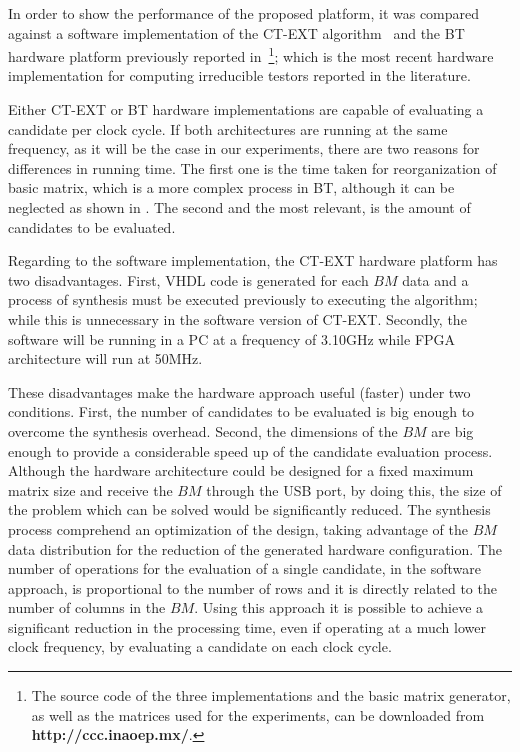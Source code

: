 \documentclass[authoryear,preprint,review,12pt]{elsarticle}
\begin{document}
In order to show the performance of the proposed platform, it was compared against a software 
implementation of the CT-EXT algorithm~\citep{R22} and the BT hardware platform previously 
reported in~\citep{Rod14}\footnote{The source code of the three implementations and the basic matrix
generator, as well as the matrices used for the experiments, can be downloaded from 
\textbf{http://ccc.inaoep.mx/}.}; which is the most recent hardware implementation for computing irreducible testors reported in the literature.
 

Either CT-EXT or BT hardware implementations are capable of evaluating a candidate per clock 
cycle. If both architectures are running at the same frequency, as it will be the case in our experiments, 
there are two reasons for differences in running time. The first one is the time taken for reorganization 
of basic matrix, which is a more complex process in BT, although it can be neglected as shown in \citep{R21}. 
The second and the most relevant, is the amount of candidates to be evaluated. 

Regarding to the software implementation, the CT-EXT hardware platform has two disadvantages. First, 
VHDL code is generated for each $BM$ data and a process of synthesis must be executed previously to 
executing the algorithm; while this is unnecessary in the software version of CT-EXT. Secondly, the 
software will be running in a PC at a frequency of 3.10GHz while FPGA architecture will run at 50MHz. 

These disadvantages make the hardware approach useful (faster) under two conditions. First, the number of 
candidates to be evaluated is big enough to overcome the synthesis overhead. Second, the dimensions of the 
$BM$ are big enough to provide a considerable speed up of the candidate evaluation process. Although 
the hardware architecture could be designed for a fixed maximum matrix size and receive the $BM$ through the 
USB port, by doing this, the size of the problem which can be solved would be significantly reduced. The 
synthesis process comprehend an optimization of the design, taking advantage of the $BM$ data distribution for 
the reduction of the generated hardware configuration. The number of operations for the evaluation of a single 
candidate, in the software approach, is proportional to the number of rows and it is directly related to the 
number of columns in the $BM$. Using this approach it is possible to achieve a significant reduction in the processing time, even if
operating at a much lower clock frequency, by evaluating a candidate on each clock cycle.
\end{document}
